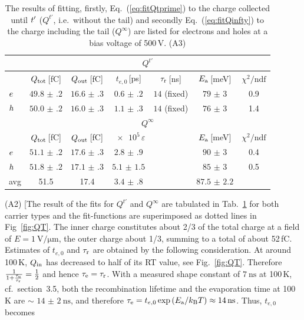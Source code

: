\begin{table}[tb]
 \centering
 \caption{The results of fitting, firstly, Eq.~(\ref{eq:fitQtprime}) to the charge collected until $\mathnormal{t'}$ ($Q^{t'}$, i.e.~without the tail)
 and secondly Eq.~(\ref{eq:fitQinfty}) to the charge including the tail ($Q^{\infty}$) are listed for electrons and holes at a bias voltage of 500\,V. {\color{red}(A3)}}
   \vspace{0.5cm}

 \begin{tabular}{lcccccc}
\toprule
 & \multicolumn{6}{c}{$Q^{t'}$}  \\  \midrule%
 & $Q_{\textrm{tot}}$\,[fC] & $Q_{\textrm{out}}$\,[fC] & $t_{e,0}$\,[ps] &  $\tau_\textrm{r}$\,[ns]  & $E_{\textrm{a}}$\,[meV]& $\chi^2/\textrm{ndf}$\\
\midrule
 $\mathnormal{e}$ & $\num{49.8(2)}$ & $\num{16.6(3)}$ & $\num{0.6(2)}$ & $\num{14}$ (fixed) & $\num{79(3)}$ & 0.9 \\
 $\mathnormal{h}$ & $\num{50.0(2)}$ & $\num{16.0(3)}$ & $\num{1.1(3)}$ & $\num{14}$ (fixed) & $\num{76(3)}$ & 1.4 \\ \midrule
 & \multicolumn{6}{c}{$Q^{\infty}$}\\ \midrule
 & $Q_{\textrm{tot}}$\,[fC]   & $Q_{\textrm{out}}$\,[fC]     &  $\num{e5}\,\varepsilon$  & & $E_{\textrm{a}}$\,[meV] & $\chi^2/\textrm{ndf}$ \\ 
 \midrule
$\mathnormal{e}$ & $\num{51.1(2)}$ & $\num{17.6(3)}$ & $\num{2.8(9)}$     & & $\num{90(3)}$ & 0.4\\
$\mathnormal{h}$ & $\num{51.8(2)}$ & $\num{17.1(3)}$ & $\num{5.1(15)}$    & & $\num{85(3)}$ & 0.5\\
avg  & 51.5            & 17.4            & $\num{3.4(8)}$     & & $\num{87.5(22)}$ & \\
\bottomrule
 \end{tabular}
 \label{tab:fitQ}
\end{table} %

{\color{red}(A2)} [The result of the fits for $Q^{t'}$ and $Q^{\infty}$ are tabulated in Tab.~\ref{tab:fitQ} for both carrier types
 and the fit-functions are superimposed as dotted lines in Fig~\ref{fig:QT}. 
The inner charge constitutes about 2/3 of the total charge at a field of $E = \SI{1}{\volt/\micro\meter}$, the outer charge about 1/3,
 summing to a total of about 52\,fC. 
Estimates of $t_{e,0}$ and $\tau_\textrm{r}$ are obtained by the following consideration. 
At around 100\,K, $Q_{\textrm{in}}$ has decreased to half of its RT value, see Fig.~\ref{fig:QT}. 
Therefore $\frac{1}{1+\frac{\tau_\textrm{e}}{\tau_\textrm{r}}} = \frac{1}{2}$ and hence $\tau_\textrm{e} = \tau_\textrm{r}$. 
With a measured shape constant of $\SI{7}{\ns}$ at 100\,K, cf.\ section~3.5, both the recombination lifetime and the evaporation time at 100\,K are $\sim$ $\SI{14(2)}{\ns}$,
 and therefore $\tauevap = t_{e,0} \exppEa \approx \SI{14}{\ns}$.
Thus, $t_{e,0}$ becomes 

